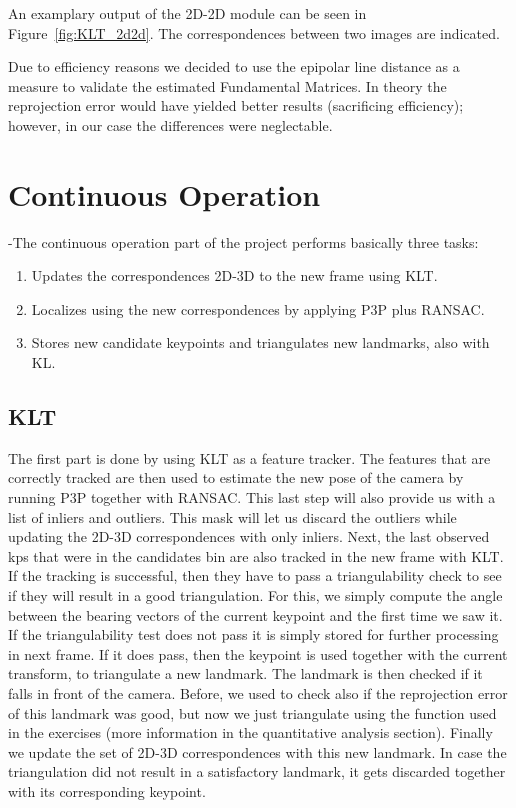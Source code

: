 An examplary output of the 2D-2D module can be seen in Figure~\ref{fig:KLT_2d2d}. The correspondences between two images are indicated.

Due to efficiency reasons we decided to use the epipolar line distance as a measure to validate the estimated Fundamental Matrices. In theory the reprojection error would have yielded better results (sacrificing efficiency); however, in our case the differences were neglectable.

\section{Continuous Operation}
\label{s:ContOp}

-The continuous operation part of the project performs basically three tasks:

\begin{enumerate}
	\item Updates the correspondences 2D-3D to the new frame using KLT.
	\item Localizes using the new correspondences by applying P3P plus RANSAC.
	\item Stores new candidate keypoints and triangulates new landmarks, also with KL.
\end{enumerate}


\subsection{KLT}

The first part is done by using KLT as a feature tracker. The features that are correctly tracked are then used to estimate the new pose of the camera
by running P3P together with RANSAC. This last step will also provide us with a list of inliers and outliers.
This mask will let us discard the outliers while updating the 2D-3D correspondences with only inliers.
Next, the last observed kps that were in the candidates bin are also tracked in the new frame with KLT. If the tracking is successful, then
they have to pass a triangulability check to see if they will result in a good triangulation.
For this, we simply compute the angle between the bearing vectors of the current keypoint and the first time we saw it.
If the triangulability test does not pass it is simply stored for further processing in next frame.
If it does pass, then the keypoint is used together with the current transform, to triangulate a new landmark.
The landmark is then checked if it falls in front of the camera.
Before, we used to check also if the reprojection error of this landmark was
good, but now we just triangulate using the function used in the exercises (more information in the quantitative analysis section).
Finally we update the set of 2D-3D correspondences with this new landmark.
In case the triangulation did not result in a satisfactory landmark, it gets discarded together with its corresponding keypoint.


